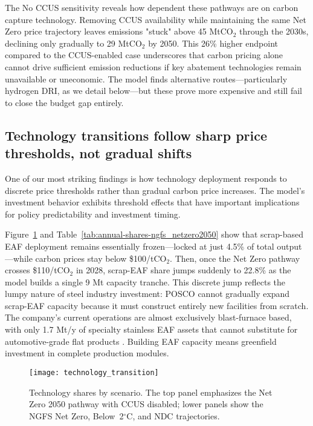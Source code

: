 The No CCUS sensitivity reveals how dependent these pathways are on carbon capture technology. Removing CCUS availability while maintaining the same Net Zero price trajectory leaves emissions "stuck" above 45 MtCO$_2$ through the 2030s, declining only gradually to 29 MtCO$_2$ by 2050. This 26\% higher endpoint compared to the CCUS-enabled case underscores that carbon pricing alone cannot drive sufficient emission reductions if key abatement technologies remain unavailable or uneconomic. The model finds alternative routes—particularly hydrogen DRI, as we detail below—but these prove more expensive and still fail to close the budget gap entirely.

\subsection{Technology transitions follow sharp price thresholds, not gradual shifts}

One of our most striking findings is how technology deployment responds to discrete price thresholds rather than gradual carbon price increases. The model's investment behavior exhibits threshold effects that have important implications for policy predictability and investment timing.

Figure~\ref{fig:technology-transition} and Table~\ref{tab:annual-shares-ngfs_netzero2050} show that scrap-based EAF deployment remains essentially frozen—locked at just 4.5\% of total output—while carbon prices stay below \$100/tCO$_2$. Then, once the Net Zero pathway crosses \$110/tCO$_2$ in 2028, scrap-EAF share jumps suddenly to 22.8\% as the model builds a single 9 Mt capacity tranche. This discrete jump reflects the lumpy nature of steel industry investment: POSCO cannot gradually expand scrap-EAF capacity because it must construct entirely new facilities from scratch. The company's current operations are almost exclusively blast-furnace based, with only 1.7 Mt/y of specialty stainless EAF assets that cannot substitute for automotive-grade flat products \citep{POSCO2023SR}. Building EAF capacity means greenfield investment in complete production modules.

\begin{figure}[!t]
  \centering
  \texttt{[image: technology\_transition]}
  \caption{Technology shares by scenario. The top panel emphasizes the Net Zero 2050 pathway with CCUS disabled; lower panels show the NGFS Net Zero, Below~2$^\circ$C, and NDC trajectories.}
  \label{fig:technology-transition}
\end{figure}

